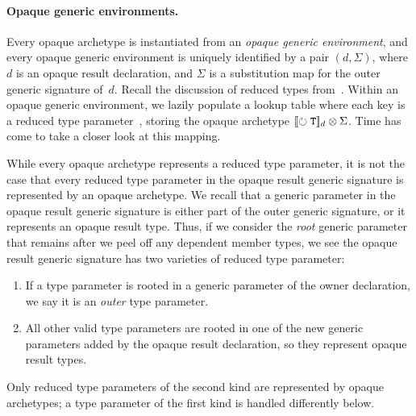 \documentclass[../generics]{subfiles}
\begin{document}
\paragraph{Opaque generic environments.}
Every opaque archetype is instantiated from an \emph{opaque generic environment}, and every opaque generic environment is uniquely identified by a pair $(d, \Sigma)$, where $d$ is an opaque result declaration, and $\Sigma$ is a substitution map for the outer generic signature of~$d$. Recall the discussion of reduced types from~. Within an opaque generic environment, we lazily populate a lookup table where each key is a reduced type parameter~\tT, storing the opaque archetype $[\![\circlearrowright \texttt{\texttt{T}}]\!]_d \otimes \Sigma$. Time has come to take a closer look at this mapping.

While every opaque archetype represents a reduced type parameter, it is not the case that every reduced type parameter in the opaque result generic signature is represented by an opaque archetype. We recall that a generic parameter in the opaque result generic signature is either part of the outer generic signature, or it represents an opaque result type. Thus, if we consider the \emph{root} generic parameter that remains after we peel off any dependent member types, we see the opaque result generic signature has two varieties of reduced type parameter:
\begin{enumerate}
\item If a type parameter is rooted in a generic parameter of the owner declaration, we say it is an \emph{outer} type parameter.
\item All other valid type parameters are rooted in one of the new generic parameters added by the opaque result declaration, so they represent opaque result types.
\end{enumerate}
Only reduced type parameters of the second kind are represented by opaque archetypes; a type parameter of the first kind is handled differently below.
\end{document}
